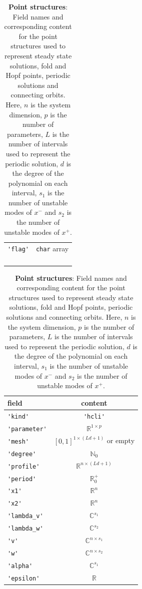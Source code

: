 \documentclass[10pt]{scrartcl}
\newcommand{\RR}{\mathbb{R}}
\newcommand{\NN}{\mathbb{N}}
\newcommand{\CC}{\mathbb{C}}
\newcommand{\blist}[1]{\mbox{\lstinline!#1!}}
\begin{document}
\begin{table}[htbp]
{\begin{center}
\begin{subtable}[b]{0.45\textwidth}
\begin{tabular}[t]{lc}
        \blist{'flag'} & \blist{char} array\\
        \\ \\ \\ \\\hline
      \end{tabular}
      \caption{Periodic orbit}
    \end{subtable}
    \begin{subtable}[b]{0.45\textwidth}\centering
      \begin{tabular}[t]{lc}\hline\noalign{\smallskip}
        field     & content           \\\hline \noalign{\smallskip}
        \blist{'kind'}      & \blist{'hcli'}            \\
        \blist{'parameter'} & $\RR^{1\times p}$ \\
        \blist{'mesh'}      & $[0,1]^{1\times (Ld+1)}$ or empty \\
        \blist{'degree'}    & $\NN_0$           \\
        \blist{'profile'}   & $\RR^{n\times (Ld+1)}$ \\
        \blist{'period'}    & $\RR^+_0$         \\
        \blist{'x1'}        & $\RR^{n}$ \\
        \blist{'x2'}        & $\RR^{n}$ \\
        \blist{'lambda_v'}  & $\CC^{s_1}$\\
        \blist{'lambda_w'}  & $\CC^{s_2}$\\
        \blist{'v'}         & $\CC^{n\times s_1}$\\
        \blist{'w'}         & $\CC^{n\times s_2}$\\
        \blist{'alpha'}     & $\CC^{s_1}$\\
        \blist{'epsilon'}   & $\RR$\\\hline
      \end{tabular}
      \caption{Connecting orbit}
    \end{subtable}
  \end{center}
}
\caption{\label{point_structures} \textbf{\textsf{Point structures}}:
Field names and corresponding content for the 
point structures used to represent steady state solutions, fold and Hopf 
points, periodic solutions and connecting orbits. Here, $n$ is 
the system dimension, $p$ is the
number of parameters, $L$ is the number of intervals used to represent
the periodic solution, $d$ is the degree of the polynomial on each
interval, $s_1$ is the number of unstable modes of $x^-$ and $s_2$ is the
number of unstable modes of $x^+$.}
\end{table}
\end{document}
